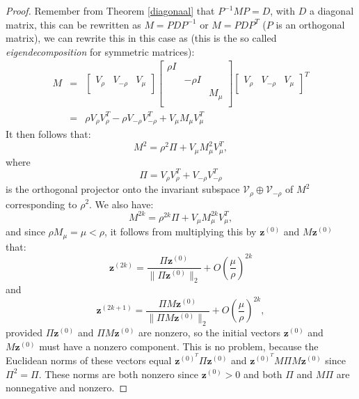 \documentclass[a4paper,11pt]{report}
\begin{document}
\begin{proof}
Remember from Theorem \ref{diagonaal} that $P^{-1}MP = D$, with $D$ a diagonal 
matrix, this can be rewritten as $M = PDP^{-1}$ or $M = PDP^T$ ($P$ is an orthogonal 
matrix), we can rewrite this in this case as (this is the so called \textit{eigendecomposition} for symmetric matrices):
\begin{eqnarray*}
M &=& \begin{bmatrix} 
V_\rho & V_{-\rho} & V_\mu \\ \end{bmatrix}
\begin{bmatrix}
\rho I & \; & \; \\
\; & -\rho I & \;\\
\; & \; & M_\mu \\
\end{bmatrix}\begin{bmatrix}
V_\rho & V_{-\rho} & V_\mu \\ \end{bmatrix}^T\\
&=&  \rho V_\rho V^T_\rho - \rho V_{-\rho}V^T_{-\rho} + V_{\mu}M_{\mu}V_{\mu}^T
\end{eqnarray*}
It then follows that:
$$M^2 = \rho^2 \Pi + V_\mu M^2_\mu V_\mu^T,$$
where
$$\Pi = V_\rho V_\rho^T + V_{-\rho}V_{-\rho}^T$$
 is the orthogonal projector onto the invariant subspace $\mathcal{V}_\rho \oplus \mathcal{V}_{-\rho}$ 
 of $M^2$ corresponding to $\rho^2$. We also have:
 $$M^{2k} = \rho^{2k}\Pi + V_\mu M^{2k}_\mu V_\mu^T,$$
 and since $\rho{M_\mu} = \mu < \rho$, it follows from multiplying this by $\mathbf{z}^{(0)}$ 
 and $M\mathbf{z}^{(0)}$ that:
 $$\mathbf{z}^{(2k)} = \frac{\Pi\mathbf{z}^{(0)}}{\|\Pi\mathbf{z}^{(0)}\|_2} + 
 O\left(\frac{\mu}{\rho}\right)^{2k}$$
 and
 $$\mathbf{z}^{(2k+1)} = \frac{\Pi M \mathbf{z}^{(0)}}{\|\Pi M \mathbf{z}^{(0)}\|_2} + 
 O\left(\frac{\mu}{\rho}\right)^{2k},$$
 provided $\Pi \mathbf{z}^{(0)}$ and $\Pi M \mathbf{z}^{(0)}$ are nonzero, so the 
 initial vectors $\mathbf{z}^{(0)}$ and $M\mathbf{z}^{(0)}$ must have a nonzero 
 component. This is no problem, because the Euclidean norms of these vectors 
 equal $\mathbf{z}^{(0)}^T \Pi \mathbf{z}^{(0)}$ and $\mathbf{z}^{(0)}^T M \Pi M \mathbf{z}^{(0)}$ 
 since $\Pi^2 = \Pi$. These norms are both nonzero since $\mathbf{z}^{(0)} > 0$ and 
 both $\Pi$ and $M\Pi$ are nonnegative and nonzero.
 

\end{proof}
\end{document}
